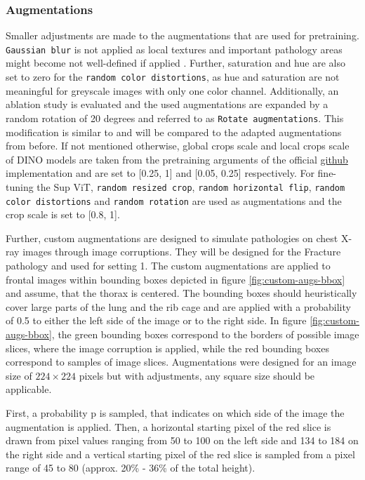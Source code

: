 \subsubsection{Augmentations}
Smaller adjustments are made to the augmentations that are used for pretraining.
\texttt{Gaussian blur} is not applied as local textures and important pathology areas might become not well-defined if applied \citep{Azizi2021}.
Further, saturation and hue are also set to zero for the \texttt{random color distortions}, as hue and saturation are not meaningful for greyscale images with only one color channel.
Additionally, an ablation study is evaluated and the used augmentations are expanded by a random rotation of 20 degrees and referred to as \texttt{Rotate augmentations}. 
This modification is similar to \citep{Azizi2021} and will be compared to the adapted augmentations from before.
If not mentioned otherwise, global crops scale and local crops scale of DINO models are taken from the pretraining arguments of the official \href{https://github.com/facebookresearch/dino#pretrained-models}{github} implementation and are set to [0.25, 1] and [0.05, 0.25] respectively. 
For fine-tuning the Sup ViT, \texttt{random resized crop}, \texttt{random horizontal flip}, \texttt{random color distortions} and \texttt{random rotation} are used as augmentations and the crop scale is set to [0.8, 1].
\par
Further, custom augmentations are designed to simulate pathologies on chest X-ray images through image corruptions.
They will be designed for the Fracture pathology and used for setting 1.
The custom augmentations are applied to frontal images within bounding boxes depicted in figure \ref{fig:custom-augs-bbox} and assume, that the thorax is centered.
The bounding boxes should heuristically cover large parts of the lung and the rib cage and are applied with a probability of 0.5 to either the left side of the image or to the right side.
In figure \ref{fig:custom-augs-bbox}, the green bounding boxes correspond to the borders of possible image slices, where the image corruption is applied, while the red bounding boxes correspond to samples of image slices.
Augmentations were designed for an image size of $224\times224$ pixels but with adjustments, any square size should be applicable.
\par
First, a probability p is sampled, that indicates on which side of the image the augmentation is applied.
Then, a horizontal starting pixel of the red slice is drawn from pixel values ranging from 50 to 100 on the left side and 134 to 184 on the right side and a vertical starting pixel of the red slice is sampled from a pixel range of 45 to 80 (approx. 20\% - 36\% of the total height).
